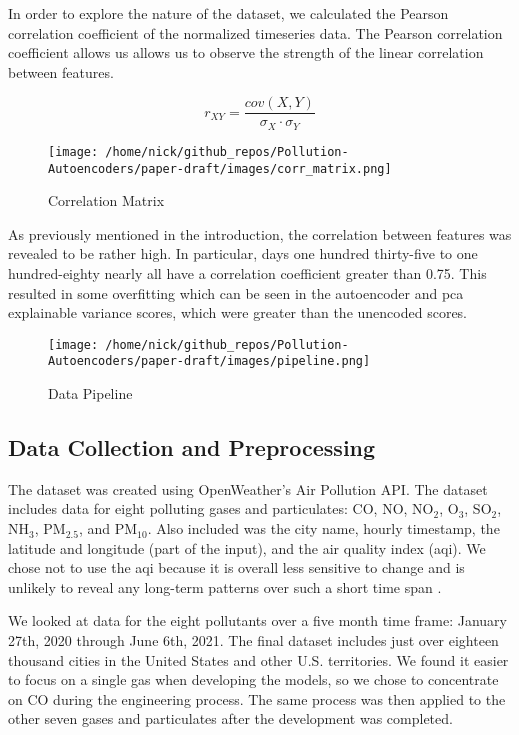 \documentclass{article}
\begin{document}
\par In order to explore the nature of the dataset, we calculated the Pearson correlation coefficient of the normalized timeseries data. The Pearson correlation coefficient allows us allows us to observe the strength of the linear correlation between features. 

\begin{equation*}
    r_{XY}=\frac{cov(X,Y)}{\sigma_{X} \cdot \sigma_{Y}}
\end{equation*}

\begin{figure}[h!]
\texttt{[image: /home/nick/github\_repos/Pollution-Autoencoders/paper-draft/images/corr\_matrix.png]}
\caption{Correlation Matrix}
\label{fig:matrix}
\end{figure}

\par As previously mentioned in the introduction, the correlation between features was revealed to be rather high. In particular, days one hundred thirty-five to one hundred-eighty nearly all have a correlation coefficient greater than 0.75. This resulted in some overfitting which can be seen in the autoencoder and pca explainable variance scores, which were greater than the unencoded scores.

\newpage
\begin{Center}
\begin{figure}[h!]
\caption{Data Pipeline}
\label{fig:pipeline}
    \hspace{1.5cm}\texttt{[image: /home/nick/github\_repos/Pollution-Autoencoders/paper-draft/images/pipeline.png]}
\end{figure}
\end{Center}

\subsection{Data Collection and Preprocessing}
The dataset was created using OpenWeather's Air Pollution API. The dataset includes data for 
eight polluting gases and particulates: CO, NO, NO$_2$, O$_3$, SO$_2$, NH$_3$, PM$_{2.5}$, 
and PM$_{10}$. Also included was the city name, hourly timestamp, the latitude and longitude (part of the input), and the air quality index (aqi). We chose not to use the aqi because it is overall less sensitive to change and is unlikely to reveal any long-term patterns over such a short time span .
\par We looked at data for the eight pollutants over a five month time frame: January 27th, 2020 through June 6th, 2021. The final dataset includes just over eighteen thousand cities in the United States and other U.S. territories. We found it easier to focus on a single gas when developing the models, so we chose to concentrate on CO during the engineering process. The same process was then applied to the other seven gases and particulates after the development was completed.
\end{document}
